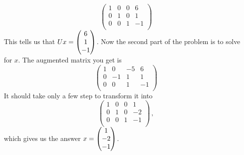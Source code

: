 {\[
\left( \begin{array}{ccc|c}
1& 0& 0 & 6 \\
0& 1& 0  & 1 \\
0& 0& 1  & -1\\
\end{array} \right)
\]
This tells us that $Ux = \begin{pmatrix} 6\\1\\-1 \end{pmatrix}$. Now the second part of the problem is to solve for $x$. The augmented matrix you get is 
\[
\left( \begin{array}{ccc|c}
1 & 0 & -5 & 6 \\
0 & -1 &1 & 1 \\
0 & 0 & 1 & -1 \\
\end{array} \right)
\]
It should take only a few step to transform it into
\[
\left( \begin{array}{ccc|c}
1& 0& 0 & 1 \\
0& 1& 0  & -2 \\
0& 0& 1  & -1\\
\end{array} \right) \, ,
\]
which gives us the answer $x= \begin{pmatrix} 1\\ -2\\-1 \end{pmatrix}$.




} %

